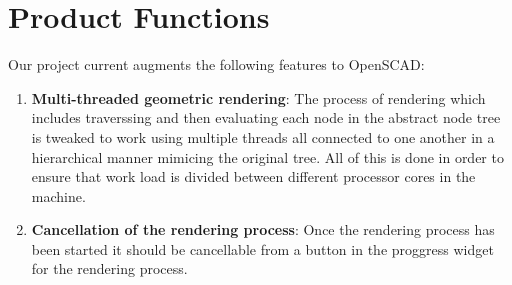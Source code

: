 \section{Product Functions}
Our project current augments the following features to OpenSCAD:
\begin{enumerate}
	\item \textbf{Multi-threaded geometric rendering}: The process of rendering which includes traverssing and then evaluating each node in the abstract node tree is tweaked to work using multiple threads all connected to one another in a hierarchical manner mimicing the original tree. All of this is done in order to ensure that work load is divided between different processor cores in the machine.
	\item \textbf{Cancellation of the rendering process}: Once the rendering process has been started it should be cancellable from a button in the proggress widget for the rendering process.
\end{enumerate}
